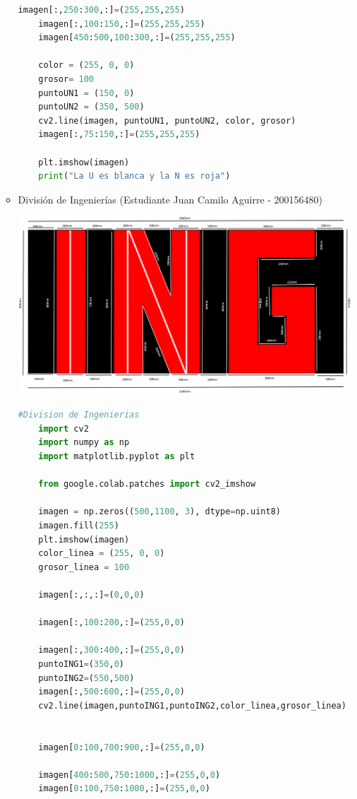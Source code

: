 \begin{enumerate}
\begin{itemize}
\begin{lstlisting}[language=Python]
    imagen[:,250:300,:]=(255,255,255)
    imagen[:,100:150,:]=(255,255,255)
    imagen[450:500,100:300,:]=(255,255,255)
    
    color = (255, 0, 0)
    grosor= 100
    puntoUN1 = (150, 0)
    puntoUN2 = (350, 500)
    cv2.line(imagen, puntoUN1, puntoUN2, color, grosor)
    imagen[:,75:150,:]=(255,255,255)
    
    plt.imshow(imagen)
    print("La U es blanca y la N es roja")
    \end{lstlisting}
    
    \item División de Ingenierías  (Estudiante Juan Camilo Aguirre - 200156480)
    \begin{center}
    \includegraphics[width=125mm]{imagenes-colab/maquetaing.png}
    \end{center}
    \begin{lstlisting}[language=Python]
    #Division de Ingenierias
    import cv2
    import numpy as np
    import matplotlib.pyplot as plt
    
    from google.colab.patches import cv2_imshow
    
    imagen = np.zeros((500,1100, 3), dtype=np.uint8)
    imagen.fill(255)
    plt.imshow(imagen)
    color_linea = (255, 0, 0)
    grosor_linea = 100
    
    imagen[:,:,:]=(0,0,0)
    
    imagen[:,100:200,:]=(255,0,0)
    
    imagen[:,300:400,:]=(255,0,0)
    puntoING1=(350,0)
    puntoING2=(550,500)
    imagen[:,500:600,:]=(255,0,0)
    cv2.line(imagen,puntoING1,puntoING2,color_linea,grosor_linea)
    
    
    imagen[0:100,700:900,:]=(255,0,0)
    
    imagen[400:500,750:1000,:]=(255,0,0)
    imagen[0:100,750:1000,:]=(255,0,0)
    

\end{lstlisting}
\end{itemize}
\end{enumerate}
